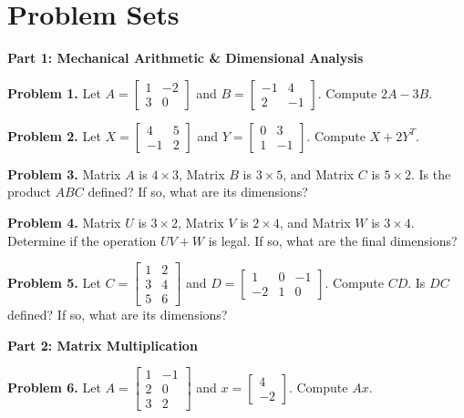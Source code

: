 \documentclass[11pt]{article}
\begin{document}
\newpage
\section{Problem Sets}

\textbf{Part 1: Mechanical Arithmetic \& Dimensional Analysis}
\vspace{0.3cm}

\noindent \textbf{Problem 1.} Let $A = \begin{bmatrix} 1 & -2 \\ 3 & 0 \end{bmatrix}$ and $B = \begin{bmatrix} -1 & 4 \\ 2 & -1 \end{bmatrix}$. Compute $2A - 3B$.

\noindent \textbf{Problem 2.} Let $X = \begin{bmatrix} 4 & 5 \\ -1 & 2 \end{bmatrix}$ and $Y = \begin{bmatrix} 0 & 3 \\ 1 & -1 \end{bmatrix}$. Compute $X + 2Y^T$.

\noindent \textbf{Problem 3.} Matrix $A$ is $4 \times 3$, Matrix $B$ is $3 \times 5$, and Matrix $C$ is $5 \times 2$. Is the product $ABC$ defined? If so, what are its dimensions?

\noindent \textbf{Problem 4.} Matrix $U$ is $3 \times 2$, Matrix $V$ is $2 \times 4$, and Matrix $W$ is $3 \times 4$. Determine if the operation $U V + W$ is legal. If so, what are the final dimensions?

\noindent \textbf{Problem 5.} Let $C = \begin{bmatrix} 1 & 2 \\ 3 & 4 \\ 5 & 6 \end{bmatrix}$ and $D = \begin{bmatrix} 1 & 0 & -1 \\ -2 & 1 & 0 \end{bmatrix}$. Compute $CD$. Is $DC$ defined? If so, what are its dimensions?

\vspace{0.5cm}
\textbf{Part 2: Matrix Multiplication}
\vspace{0.3cm}

\noindent \textbf{Problem 6.} Let $A = \begin{bmatrix} 1 & -1 \\ 2 & 0 \\ 3 & 2 \end{bmatrix}$ and $x = \begin{bmatrix} 4 \\ -2 \end{bmatrix}$. Compute $Ax$.
\end{document}
